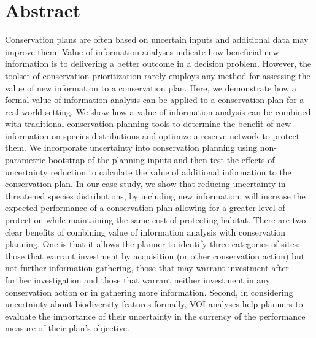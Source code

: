 \clearpage
\section*{Abstract}\label{abstract}

Conservation plans are often based on uncertain inputs and additional data may improve them. Value of information analyses indicate how beneficial new information is to delivering a better outcome in a decision problem. However, the toolset of conservation prioritization rarely employs any method for assessing the value of new information to a conservation plan. Here, we demonstrate how a formal value of information analysis can be applied to a conservation plan for a real-world setting. We show how a value of information analysis can be combined with traditional conservation planning tools to determine the benefit of new information on species distributions and optimize a reserve network to protect them. We incorporate uncertainty into conservation planning using non-parametric bootstrap of the planning inputs and then test the effects of uncertainty reduction to calculate the value of additional information to the conservation plan. In our case study, we show that reducing uncertainty in threatened species distributions, by including new information, will increase the expected performance of a conservation plan allowing for a greater level of protection while maintaining the same cost of protecting habitat. There are two clear benefits of combining value of information analysis with conservation planning. One is that it allows the planner to identify three categories of sites: those that warrant investment by acquisition (or other conservation action) but not further information gathering, those that may warrant investment after further investigation and those that warrant neither investment in any conservation action or in gathering more information. Second, in considering uncertainty about biodiversity features formally, VOI analyses help planners to evaluate the importance of their uncertainty in the currency of the performance measure of their plan's objective.

\clearpage
